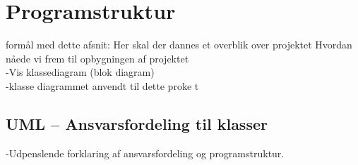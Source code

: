 \section{Programstruktur}
formål med dette afsnit: Her skal der dannes et overblik over projektet
Hvordan nåede vi frem til opbygningen af projektet\\

-Vis klassediagram (blok diagram)\\
-klasse diagrammet anvendt til dette proke t


\subsection{UML – Ansvarsfordeling til klasser}
-Udpenslende forklaring af ansvarsfordeling og programstruktur.  